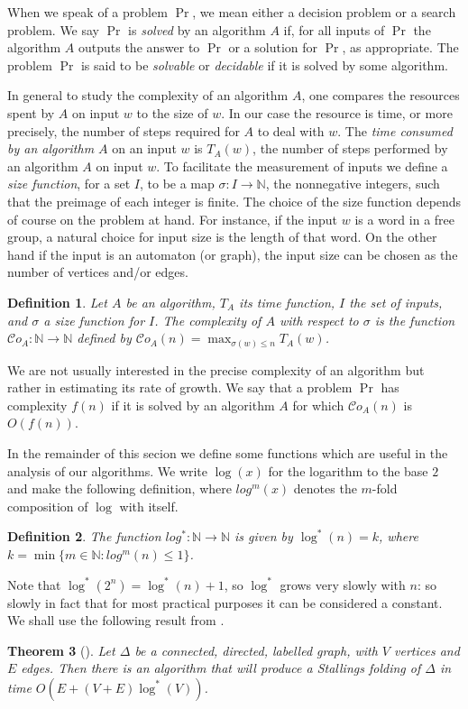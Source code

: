 \documentclass[a4paper,12pt]{article}
\newcommand{\D}{\Delta }
\newtheorem{theorem}{Theorem}[section]
\newtheorem{definition}[theorem]{Definition}
\numberwithin{equation}{section}
\numberwithin{figure}{section}
\newcommand{\NN}{\ensuremath{\mathbb{N}}}
\newcommand{\cC}{\mathcal{C}}
\newcommand{\maps}{\rightarrow}
\begin{document}
When we speak of a problem $\Pr$, we mean either a decision problem
or a search problem. 
 We say $\Pr$ is \emph{solved} by an algorithm $A$ if, for all inputs of $\Pr$ the
algorithm $A$ outputs the answer to $\Pr$ or a solution for $\Pr$, 
as appropriate.  
The problem $\Pr$ is said to be \emph{solvable} or \emph{decidable} if it is
solved by some algorithm.    

 In general to study the complexity of an algorithm $A$,
one compares the resources spent by $A$ on input $w$ to the size of
$w$. 
In our case the resource is time, or more precisely, the number
of steps required for $A$ to deal with $w$. 
The \emph{time consumed by an algorithm $A$} on an input $w$ is
$T_{A}(w)$, the number of steps performed by an algorithm $A$ on
 input $w$. To facilitate the measurement of inputs we define a
 \emph{size function}, for a set $I$, to be a map $\sigma:I\to \mathbb N$, the
nonnegative integers, such that the preimage of each integer is
finite. 
The choice of the size function depends of course on the problem at hand.
For instance, if the input $w$ is a word in a free group, a natural 
choice for input size is the length of that word. 
On the other hand  if the input is 
an automaton (or graph), the input size can be chosen as the number of vertices and/or edges.
\begin{definition}
Let $A$ be an algorithm, $T_{A}$ its time function, $I$ the set of
inputs, and $\sigma$ a size function for $I$. The \emph{ complexity of $A$} with respect to $\sigma$ is the function
$\cC o_{A}:\NN \to \NN$ defined by $\cC o_{A}(n)=\max_{\sigma(w)\le n}
T_{A}(w)$.
\end{definition}

We are not usually interested in the precise complexity of an algorithm 
but rather in estimating its rate of growth. We say that a problem
$\Pr$ has  complexity $f(n)$ if it is solved by an
algorithm $A$ for which $\cC o_{A}(n)$ is $O(f(n))$.

In the remainder of this secion we define some functions which are useful
in the analysis of our algorithms. We write $\log(x)$ for the logarithm to the base $2$ and make the
following definition, where $log^m(x)$ denotes the $m$-fold composition
of $\log$ with itself.
\begin{definition}\label{def:log}
The function $log^*:\NN\maps \NN$ is given by $\log^*(n)=k$, where
$k=\min\{m\in \NN: log^m(n)\le 1\}$.
\end{definition}
Note that $\log^*(2^n)=\log^*(n)+1$, so $\log^*$ grows very slowly with $n$:
so slowly in fact that for most practical purposes it can be
considered a constant.
We shall use the following result from \cite{touikan06}.
\begin{theorem}[{\cite[Theorem 1.6]{touikan06}}]%
Let $\D$ be a connected, directed, labelled graph, with $V$ vertices and
$E$ edges. Then there is an algorithm that will produce a Stallings folding of
$\D$ in time $O(E+(V+E)\log^*(V))$.
\end{theorem}
\end{document}
